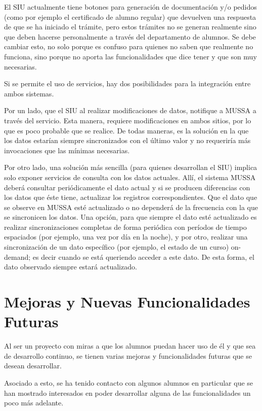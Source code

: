 \documentclass[a4paper]{article}
\begin{document}
El SIU actualmente tiene botones para generación de documentación y/o pedidos (como por ejemplo el certificado de alumno regular) que devuelven una respuesta de que se ha iniciado el trámite, pero estos trámites no se generan realmente sino que deben hacerse personalmente a través del departamento de alumnos. Se debe cambiar esto, no solo porque es confuso para quienes no saben que realmente no funciona, sino porque no aporta las funcionalidades que dice tener y que son muy necesarias.\newline

Si se permite el uso de servicios, hay dos posibilidades para la integración entre ambos sistemas.

Por un lado, que el SIU al realizar modificaciones de datos, notifique a MUSSA a través del servicio. Esta manera, requiere modificaciones en ambos sitios, por lo que es poco probable que se realice. De todas maneras, es la solución en la que los datos estarían siempre sincronizados con el último valor y no requeriría más invocaciones que las mínimas necesarias.

Por otro lado, una solución más sencilla (para quienes desarrollan el SIU) implica solo exponer servicios de consulta con los datos actuales. Allí, el sistema MUSSA deberá consultar periódicamente el dato actual y si se producen diferencias con los datos que éste tiene, actualizar los registros correspondientes. Que el dato que se observe en MUSSA esté actualizado o no dependerá de la frecuencia con la que se sincronicen los datos. Una opción, para que siempre el dato esté actualizado es realizar sincronizaciones completas de forma periódica con períodos de tiempo espaciados (por ejemplo, una vez por día en la noche), y por otro, realizar una sincronización de un dato específico (por ejemplo, el estado de un curso) on-demand; es decir cuando se está queriendo acceder a este dato. De esta forma, el dato observado siempre estará actualizado.

\newpage
\section{Mejoras y Nuevas Funcionalidades Futuras}

Al ser un proyecto con miras a que los alumnos puedan hacer uso de él y que sea de desarrollo continuo, se tienen varias mejoras y funcionalidades futuras que se desean desarrollar.

Asociado a esto, se ha tenido contacto con algunos alumnos en particular que se han mostrado interesados en poder desarrollar alguna de las funcionalidades un poco más adelante.
\end{document}
